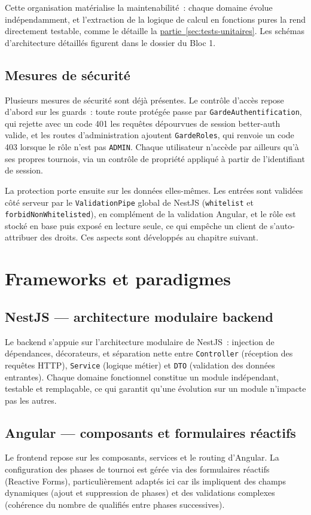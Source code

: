 Cette organisation matérialise la maintenabilité~: chaque domaine évolue indépendamment, et l'extraction de la logique de calcul en fonctions pures la rend directement testable, comme le détaille la \hyperref[sec:tests-unitaires]{partie~\ref*{sec:tests-unitaires}}. Les schémas d'architecture détaillés figurent dans le dossier du Bloc 1.

\subsection{Mesures de sécurité}
Plusieurs mesures de sécurité sont déjà présentes. Le contrôle d'accès repose d'abord sur les guards~: toute route protégée passe par \texttt{GardeAuthentification}, qui rejette avec un code 401 les requêtes dépourvues de session better-auth valide, et les routes d'administration ajoutent \texttt{GardeRoles}, qui renvoie un code 403 lorsque le rôle n'est pas \texttt{ADMIN}. Chaque utilisateur n'accède par ailleurs qu'à ses propres tournois, via un contrôle de propriété appliqué à partir de l'identifiant de session.

La protection porte ensuite sur les données elles-mêmes. Les entrées sont validées côté serveur par le \texttt{ValidationPipe} global de NestJS (\texttt{whitelist} et \texttt{forbidNonWhitelisted}), en complément de la validation Angular, et le rôle est stocké en base puis exposé en lecture seule, ce qui empêche un client de s'auto-attribuer des droits. Ces aspects sont développés au chapitre suivant.

\section{Frameworks et paradigmes}

\subsection{NestJS --- architecture modulaire backend}
Le backend s'appuie sur l'architecture modulaire de NestJS~: injection de dépendances, décorateurs, et séparation nette entre \texttt{Controller} (réception des requêtes HTTP), \texttt{Service} (logique métier) et \texttt{DTO} (validation des données entrantes). Chaque domaine fonctionnel constitue un module indépendant, testable et remplaçable, ce qui garantit qu'une évolution sur un module n'impacte pas les autres.

\subsection{Angular --- composants et formulaires réactifs}
Le frontend repose sur les composants, services et le routing d'Angular. La configuration des phases de tournoi est gérée via des formulaires réactifs (Reactive Forms), particulièrement adaptés ici car ils impliquent des champs dynamiques (ajout et suppression de phases) et des validations complexes (cohérence du nombre de qualifiés entre phases successives).

